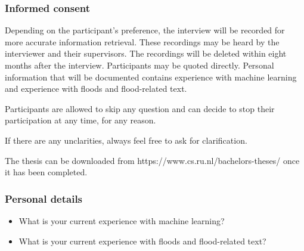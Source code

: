 \subsubsection*{Informed consent}
Depending on the participant's preference, the interview will be recorded for more accurate information retrieval. These recordings may be heard by the interviewer and their supervisors. The recordings will be deleted within eight months after the interview. Participants may be quoted directly. Personal information that will be documented contains experience with machine learning and experience with floods and flood-related text.

Participants are allowed to skip any question and can decide to stop their participation at any time, for any reason.

If there are any unclarities, always feel free to ask for clarification.

The thesis can be downloaded from https://www.cs.ru.nl/bachelors-theses/ once it has been completed.

\subsubsection*{Personal details}
\begin{itemize}
    \item What is your current experience with machine learning?
    \item What is your current experience with floods and flood-related text?
\end{itemize}

